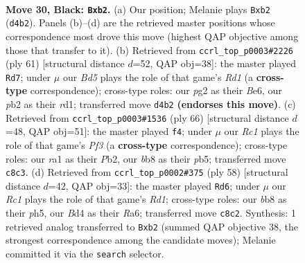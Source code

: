 \documentclass[11pt]{article}
\begin{document}
\clearpage

\begin{figure}[p]\centering
\begin{subfigure}{0.46\textwidth}\centering
\resizebox{\linewidth}{!}{%
\newchessgame
\chessboard[
  setfen={1Br5/1p3pk1/p3p3/8/3b3p/4PP2/PP4PP/R3R1K1 b - - 0 30},
  showmover=false,
  pgfstyle=straightmove, color=movearrow, markmove={d4-b2}
]}
\caption{}
\end{subfigure}\hfill
\begin{subfigure}{0.46\textwidth}\centering
\resizebox{\linewidth}{!}{%
\newchessgame
\chessboard[
  setfen={3r2k1/p4p1p/3Pb1p1/1r6/1B6/P2R3P/6P1/3R2K1 b - - 4 31},
  showmover=false,
  pgfstyle=straightmove, color=movearrow, markmove={d8-d7}
]}
\caption{}
\end{subfigure}
\\[4pt]
\begin{subfigure}{0.46\textwidth}\centering
\resizebox{\linewidth}{!}{%
\newchessgame
\chessboard[
  setfen={6k1/2R3b1/2p3p1/1pr1p2p/8/2B2PP1/1PP4P/4K3 w - - 4 34},
  showmover=false,
  pgfstyle=straightmove, color=movearrow, markmove={f3-f4}
]}
\caption{}
\end{subfigure}\hfill
\begin{subfigure}{0.46\textwidth}\centering
\resizebox{\linewidth}{!}{%
\newchessgame
\chessboard[
  setfen={2r2rk1/5p2/R1p2b2/4pp1p/1P3B2/1K6/5PPP/3R4 w - - 0 30},
  showmover=false,
  pgfstyle=straightmove, color=movearrow, markmove={d1-d6}
]}
\caption{}
\end{subfigure}
\caption{\textbf{Move 30, Black: \texttt{Bxb2}.} (a) Our position; Melanie plays \texttt{Bxb2} (\texttt{d4b2}). Panels (b)--(d) are the retrieved master positions whose correspondence most drove this move (highest QAP objective among those that transfer to it). (b) Retrieved from \texttt{ccrl\_top\_p0003\#2226} (ply 61) [structural distance $d$=52, QAP obj=38]: the master played \texttt{Rd7}; under $\mu$ our \emph{Bd5} plays the role of that game's \emph{Rd1} (a \textbf{cross-type} correspondence); cross-type roles: our \emph{p}g2 as their \emph{B}e6, our \emph{p}b2 as their \emph{r}d1; transferred move \texttt{d4b2} \textbf{(endorses this move)}. (c) Retrieved from \texttt{ccrl\_top\_p0003\#1536} (ply 66) [structural distance $d$=48, QAP obj=51]: the master played \texttt{f4}; under $\mu$ our \emph{Rc1} plays the role of that game's \emph{Pf3} (a \textbf{cross-type} correspondence); cross-type roles: our \emph{r}a1 as their \emph{P}b2, our \emph{b}b8 as their \emph{p}b5; transferred move \texttt{c8c3}. (d) Retrieved from \texttt{ccrl\_top\_p0002\#375} (ply 58) [structural distance $d$=42, QAP obj=33]: the master played \texttt{Rd6}; under $\mu$ our \emph{Rc1} plays the role of that game's \emph{Rd1}; cross-type roles: our \emph{b}b8 as their \emph{p}h5, our \emph{B}d4 as their \emph{R}a6; transferred move \texttt{c8c2}. Synthesis: 1 retrieved analog transferred to \texttt{Bxb2} (summed QAP objective 38, the strongest correspondence among the candidate moves); Melanie committed it via the \texttt{search} selector.}
\label{fig:thought-m59}
\end{figure}
\end{document}
